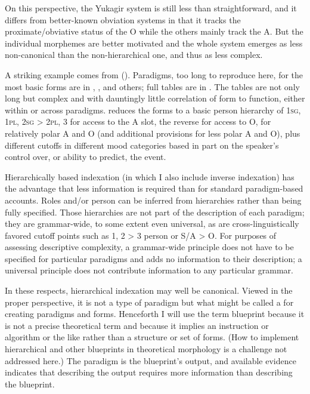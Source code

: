 \documentclass[output=collectionpaper]{langsci/langscibook}
\begin{document}
On this perspective, the Yukagir system is still less than straightforward, and it differs from better-known obviation systems in that it tracks the proximate/obvia\-tive status of the O while the others mainly track the A. But the individual morphemes are better motivated and the whole system emerges as less non-canonical than the non-hierarchical one, and thus as less complex.

A striking example comes from  (). Paradigms, too long to reproduce here, for the most basic forms are in \citet{Nagayam2003}, \citet{Malcev1998}, and others; full tables are in \citet[639--648]{Kibrik2004}. The tables are not only long but complex and with dauntingly little correlation of form to function, either within or across paradigms. \citet{Kibrik2003} reduces the forms to a basic person hierarchy of \textsc{1sg}, \textsc{1pl}, \textsc{2sg} > \textsc{2pl}, 3 for access to the A slot, the reverse for access to O, for relatively polar A and O (and additional provisions for less polar A and O), plus different cutoffs in different mood categories based in part on the speaker's control over, or ability to predict, the event.

Hierarchically based indexation (in which I also include inverse indexation) has the advantage that less information is required than for standard paradigm-based accounts. Roles and/or person can be inferred from hierarchies rather than being fully specified. Those hierarchies are not part of the description of each paradigm; they are grammar-wide, to some extent even universal, as are cross-linguistically favored cutoff points such as 1, 2 > 3 person or S/A > O. For purposes of assessing descriptive complexity, a grammar-wide principle does not have to be specified for particular paradigms and adds no information to their description; a universal principle does not contribute information to any particular grammar.

In these respects, hierarchical indexation may well be canonical. Viewed in the proper perspective, it is not a type of paradigm but what might be called a  for creating paradigms and forms. Henceforth I will use the term blueprint because it is not a precise theoretical term and because it implies an instruction or algorithm or the like rather than a structure or set of forms. (How to implement hierarchical and other blueprints in theoretical morphology is a challenge not addressed here.) The paradigm is the blueprint's output, and available evidence indicates that describing the output requires more information than describing the blueprint.
\end{document}
